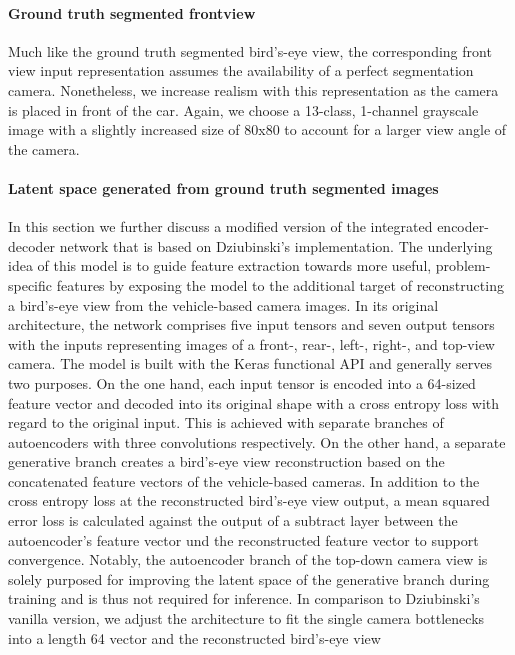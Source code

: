 \documentclass[letterpaper, 10 pt, conference]{ieeeconf}  %
\begin{document}
\paragraph{Ground truth segmented frontview}
Much like the ground truth segmented bird's-eye view, the corresponding front view input representation assumes the availability of a 
perfect segmentation camera. Nonetheless, we increase realism with this representation as the camera is placed in front of the car.
Again, we choose a 13-class, 1-channel grayscale image with a slightly increased size of 80x80 to account for a larger view angle of the 
camera. 
\paragraph{Latent space generated from ground truth segmented images}
In this section we further discuss a modified version of the integrated encoder-decoder network that is based on 
Dziubinski's \cite{dziubinskiSemanticSegmentationSemantic2019} implementation. 
The underlying idea of this model is to 
guide feature extraction towards more useful, problem-specific features by exposing the model to the additional 
target of reconstructing a bird's-eye view from the vehicle-based camera images.
In its original architecture, the network comprises 
five input tensors and seven output tensors with the inputs representing images of a front-, rear-, left-, right-, and top-view camera. The 
model is built with the Keras functional API and generally serves two purposes. On the one hand, each input tensor is encoded into 
a 64-sized feature vector and decoded into its original shape with a cross entropy loss with regard to the original input. This is 
achieved with separate branches of autoencoders with three convolutions respectively. On the other 
hand, a separate generative branch creates a bird's-eye view reconstruction based on the concatenated feature vectors of the 
vehicle-based cameras. In addition to the cross entropy loss at the reconstructed bird's-eye view output, a mean squared error 
loss is calculated against the output of a subtract layer between the autoencoder's feature vector und the reconstructed feature vector to support
convergence. Notably, the autoencoder branch of the top-down camera view is solely purposed for improving the latent space of the generative branch 
during training and is thus not required for inference. 
\newline In comparison to Dziubinski's \cite{dziubinskiSemanticSegmentationSemantic2019} vanilla version, we 
adjust the architecture to fit the single camera bottlenecks into a length 64 vector and the reconstructed bird's-eye view
\end{document}
